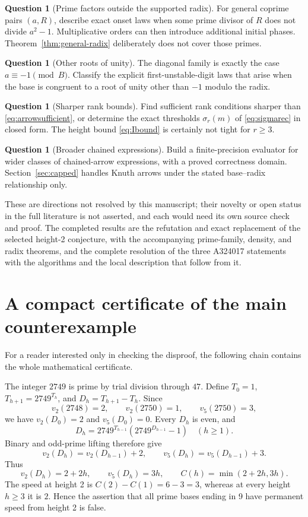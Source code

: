 \documentclass[11pt,letterpaper]{article}
\numberwithin{equation}{section}
\theoremstyle{definition}
\newtheorem{question}[theorem]{Question}
\theoremstyle{remark}
\begin{document}
\begin{question}[Prime factors outside the supported radix]
For general coprime pairs $(a,R)$, describe exact onset laws when some prime divisor of $R$ does not divide $a^2-1$. Multiplicative orders can then introduce additional initial phases. Theorem~\ref{thm:general-radix} deliberately does not cover those primes.
\end{question}

\begin{question}[Other roots of unity]
The diagonal family is exactly the case $a\equiv-1\pmod B$. Classify the explicit first-unstable-digit laws that arise when the base is congruent to a root of unity other than $-1$ modulo the radix.
\end{question}

\begin{question}[Sharper rank bounds]
Find sufficient rank conditions sharper than \eqref{eq:arrowsufficient}, or determine the exact thresholds $\sigma_r(m)$ of \eqref{eq:sigmarec} in closed form. The height bound \eqref{eq:Ibound} is certainly not tight for $r\ge3$.
\end{question}

\begin{question}[Broader chained expressions]
Build a finite-precision evaluator for wider classes of chained-arrow expressions, with a proved correctness domain. Section~\ref{sec:capped} handles Knuth arrows under the stated base--radix relationship only.
\end{question}

These are directions not resolved by this manuscript; their novelty or open status in the full literature is not asserted, and each would need its own source check and proof. The completed results are the refutation and exact replacement of the selected height-2 conjecture, with the accompanying prime-family, density, and radix theorems, and the complete resolution of the three A324017 statements with the algorithms and the local description that follow from it.

\appendix
\section{A compact certificate of the main counterexample}\label{app:certificate}

For a reader interested only in checking the disproof, the following chain contains the whole mathematical certificate.

The integer $2749$ is prime by trial division through $47$. Define $T_0=1$, $T_{h+1}=2749^{T_h}$, and $D_h=T_{h+1}-T_h$. Since
\[
 v_2(2748)=2,\qquad v_2(2750)=1,\qquad v_5(2750)=3,
\]
we have $v_2(D_0)=2$ and $v_5(D_0)=0$. Every $D_h$ is even, and
\[
 D_h=2749^{T_{h-1}}(2749^{D_{h-1}}-1)\quad(h\ge1).
\]
Binary and odd-prime lifting therefore give
\[
 v_2(D_h)=v_2(D_{h-1})+2,\qquad
 v_5(D_h)=v_5(D_{h-1})+3.
\]
Thus
\[
 v_2(D_h)=2+2h,\qquad v_5(D_h)=3h,
 \qquad C(h)=\min(2+2h,3h).
\]
The speed at height 2 is $C(2)-C(1)=6-3=3$, whereas at every height $h\ge3$ it is $2$. Hence the assertion that all prime bases ending in 9 have permanent speed from height 2 is false.
\end{document}
